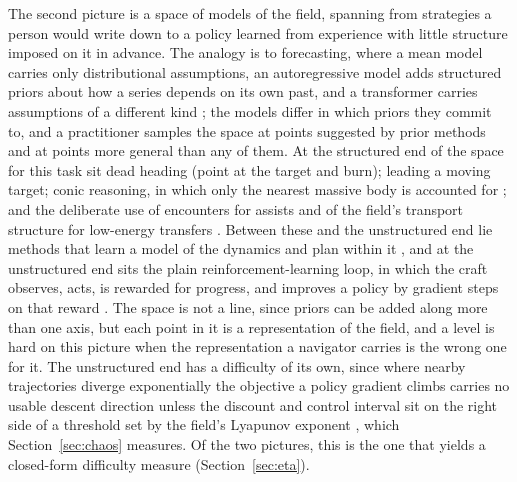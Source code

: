 \documentclass[11pt]{article}
\begin{document}
The second picture is a space of models of the field, spanning from
strategies a person would write down to a policy learned from experience
with little structure imposed on it in advance. The analogy is to
forecasting, where a mean model carries only distributional assumptions, an
autoregressive model adds structured priors about how a series depends on
its own past, and a transformer carries assumptions of a different kind
\cite{box2015,vaswani2017}; the models differ in which priors they commit
to, and a practitioner samples the space at points suggested by prior
methods and at points more general than any of them. At the structured end
of the space for this task sit dead heading (point at the target and burn);
leading a moving target; conic reasoning, in which only the nearest massive
body is accounted for \cite{bate1971}; and the deliberate use of encounters
for assists \cite{flandro1966} and of the field's transport structure for
low-energy transfers \cite{belbruno1993,koon2000}. Between these and the
unstructured end lie methods that learn a model of the dynamics and plan
within it \cite{moerland2023}, and at the unstructured end sits the plain
reinforcement-learning loop, in which the craft observes, acts, is rewarded
for progress, and improves a policy by gradient steps on that reward
\cite{sutton2018,schulman2017}. The space is not a line, since priors
can be added along more than one axis, but each point in it is a
representation of the field, and a level is hard on this picture when the
representation a navigator carries is the wrong one for it. The unstructured
end has a difficulty of its own, since where nearby trajectories diverge
exponentially the objective a policy gradient climbs carries no usable
descent direction unless the discount and control interval sit on the right
side of a threshold set by the field's Lyapunov exponent
\cite{wang2023,metz2021,parmas2018}, which Section~\ref{sec:chaos}
measures. Of the two pictures, this is the one that yields a closed-form
difficulty measure (Section~\ref{sec:eta}).
\end{document}
